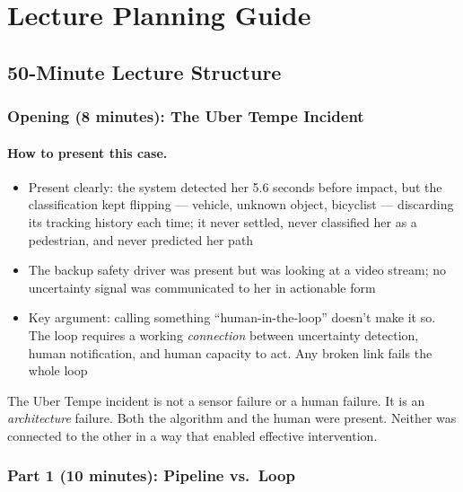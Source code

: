 \section{Lecture Planning Guide}

\subsection{50-Minute Lecture Structure}

\subsubsection{Opening (8 minutes): The Uber Tempe Incident}

\paragraph{How to present this case.}
\begin{itemize}
    \item Present clearly: the system detected her 5.6 seconds before impact, but the classification kept flipping --- vehicle, unknown object, bicyclist --- discarding its tracking history each time; it never settled, never classified her as a pedestrian, and never predicted her path
    \item The backup safety driver was present but was looking at a video stream; no uncertainty signal was communicated to her in actionable form
    \item Key argument: calling something ``human-in-the-loop'' doesn't make it so. The loop requires a working \emph{connection} between uncertainty detection, human notification, and human capacity to act. Any broken link fails the whole loop
\end{itemize}

\begin{keyconcept}
The Uber Tempe incident is not a sensor failure or a human failure. It is an \emph{architecture} failure. Both the algorithm and the human were present. Neither was connected to the other in a way that enabled effective intervention.
\end{keyconcept}

\subsubsection{Part 1 (10 minutes): Pipeline vs.\ Loop}

